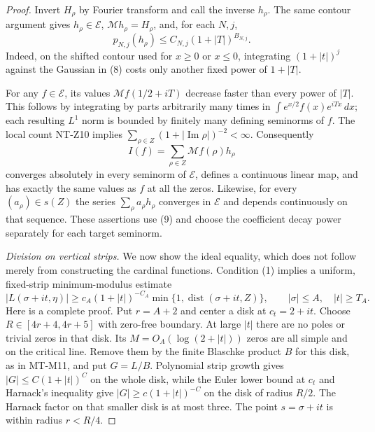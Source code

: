 \documentclass[11pt,a4paper]{article}
\begin{document}
\begin{proof}
Invert $H_\rho$ by Fourier transform and call the inverse
$h_\rho$. The same contour argument gives $h_\rho\in\mathcal E$,
$\mathcal Mh_\rho=H_\rho$, and, for each $N,j$,
\[
             p_{N,j}(h_\rho)
                    \le C_{N,j}(1+|T|)^{B_{N,j}}.      \tag{9}
\]
Indeed, on the shifted contour used for $x\ge0$ or $x\le0$,
integrating $(1+|t|)^j$ against the Gaussian in (8) costs
only another fixed power of $1+|T|$.

For any $f\in\mathcal E$, its values $\mathcal Mf(1/2+iT)$
decrease faster than every power of $|T|$. This follows by
integrating by parts arbitrarily many times in
$\int e^{x/2}f(x)e^{iTx}\,dx$; each resulting $L^1$ norm
is bounded by finitely many defining seminorms of $f$.
The local count NT-Z10 implies
$\sum_{\rho\in Z}(1+|\operatorname{Im}\rho|)^{-2}<\infty$.
Consequently
\[
              I(f)=\sum_{\rho\in Z}\mathcal Mf(\rho)h_\rho
                                                               \tag{10}
\]
converges absolutely in every seminorm of $\mathcal E$,
defines a continuous linear map, and has exactly the same
values as $f$ at all the zeros. Likewise, for every
$(a_\rho)\in s(Z)$ the series $\sum_\rho a_\rho h_\rho$
converges in $\mathcal E$ and depends continuously on that
sequence. These assertions use (9) and choose the coefficient
decay power separately for each target seminorm.

\emph{Division on vertical strips.}
We now show the ideal equality, which does not follow merely
from constructing the cardinal functions.
Condition (1) implies a uniform, fixed-strip minimum-modulus
estimate
\[
 |L(\sigma+it,\eta)|
   \ge c_A(1+|t|)^{-C_A}
            \min\{1,\operatorname{dist}(\sigma+it,Z)\},
 \qquad |\sigma|\le A,\quad |t|\ge T_A.                 \tag{11}
\]
Here is a complete proof. Put $r=A+2$ and center a disk at
$c_t=2+it$. Choose $R\in[4r+4,4r+5]$ with zero-free boundary.
At large $|t|$ there are no poles or trivial zeros in that disk.
Its $M=O_A(\log(2+|t|))$ zeros are all simple and on the
critical line. Remove them by the finite Blaschke product
$B$ for this disk, as in MT-M11, and put $G=L/B$.
Polynomial strip growth gives $|G|\le C(1+|t|)^C$ on the
whole disk, while the Euler lower bound at $c_t$ and Harnack's
inequality give
$|G|\ge c(1+|t|)^{-C}$ on the disk of radius $R/2$.
The Harnack factor on that smaller disk is at most three.
The point $s=\sigma+it$ is within radius $r<R/4$.


\end{proof}
\end{document}
